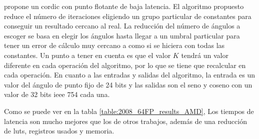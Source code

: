 \begin{table}[]
	\centering
	\caption{Resultados de 64FP \gls{cordic} y una CPU AMD Athlon 64 Processor 3200+. Num\_C es el número de co-procesadores de \gls{cordic} usados en el experimento.}
	\label{table:2008_64FP_results_AMD}
\end{table}

\cite{nguyen_low-resource_2015} propone un \gls{cordic} con punto flotante de baja latencia. El algoritmo propuesto reduce el número de iteraciones eligiendo un grupo particular de constantes para conseguir un resultado cercano al real. La reducción del número de ángulos a escoger se basa en elegir los ángulos hasta llegar a un umbral particular para tener un error de cálculo muy cercano a como si se hiciera con todas las constantes. Un punto a tener en cuenta es que el valor $K$ tendrá un valor diferente en cada operación del algoritmo, por lo que se tiene que recalcular en cada operación. En cuanto a las entradas y salidas del algoritmo, la entrada es un valor del ángulo de punto fijo de 24 bits y las salidas son el seno y coseno con un valor de 32 bits \gls{ieee} 754 cada una.

Como se puede ver en la tabla \ref{table:2008_64FP_results_AMD}, Los tiempos de latencia son mucho mejores que los de otros trabajos, además de una reducción de \gls{lut}s, registros usados y memoria.

